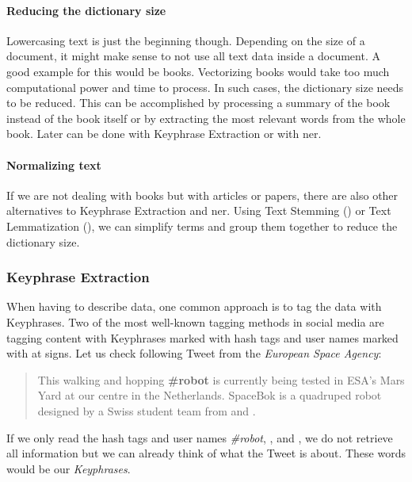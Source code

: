 \paragraph{Reducing the dictionary size}
Lowercasing text is just the beginning though.
Depending on the size of a document, it might make sense to not use all text data inside a document.
A good example for this would be books.
Vectorizing books would take too much computational power and time to process.
In such cases, the dictionary size needs to be reduced.
This can be accomplished by processing a summary of the book instead of the book itself
or by extracting the most relevant words from the whole book.
Later can be done with Keyphrase Extraction or with \Gls{ner}.

\paragraph{Normalizing text}
If we are not dealing with books but with articles or papers,
there are also other alternatives to Keyphrase Extraction and \Gls{ner}.
Using Text Stemming ()
or Text Lemmatization (),
we can simplify terms and group them together to reduce the dictionary size.

\subsubsection{Keyphrase Extraction}
\label{subsubsec:3_keyphrase_extraction}

When having to describe data, one common approach is to tag the data with Keyphrases.
Two of the most well-known tagging methods in social media
are tagging content with Keyphrases marked with hash tags and user names marked with at signs.
Let us check following Tweet from the \textit{European Space Agency}\cite{ESATweet}:

\begin{quote}
    This walking and hopping \textbf{\#robot} is currently being tested in ESA’s Mars Yard
    at our \textbf{} centre in the Netherlands.
    SpaceBok is a quadruped robot designed by a Swiss student team from \textbf{}
    and \textbf{}.
\end{quote}

If we only read the hash tags and user names \textit{\#robot}, \textit{},
\textit{} and \textit{},
we do not retrieve all information but we can already think of what the Tweet is about.
These words would be our \textit{Keyphrases}.


